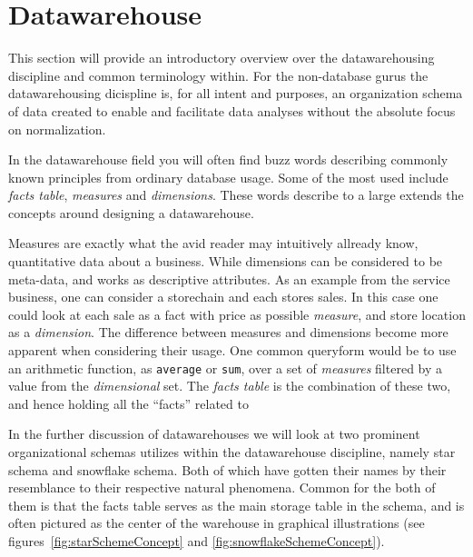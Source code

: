 \section{Datawarehouse}
	\noindent
	This section will provide an introductory overview over the datawarehousing discipline and common terminology within. 
	For the non-database gurus the datawarehousing dicispline is, for all intent and purposes, an organization schema of
	data created to enable and facilitate data analyses without the absolute focus on normalization\cite{oracle:dataware}.
	
	\bigskip\noindent
	In the datawarehouse field you will often find buzz words describing commonly known principles from ordinary database
	usage. Some of the most used include \textit{facts table}, \textit{measures} and \textit{dimensions}.
	These words describe to a large extends the concepts around designing a datawarehouse. 
	
	\bigskip\noindent
	Measures are exactly what the avid reader may intuitively allready know, quantitative data about a business.
	While dimensions can be considered to be meta-data, and works as descriptive attributes. 
	As an example from the service business, one can consider a storechain and each stores sales. 
	In this case one could look at each sale as a fact with price as possible \textit{measure},
	and store location as a \textit{dimension}. 
	The difference between measures and dimensions become more apparent when considering their usage.
	One common queryform would be to use an arithmetic function, as \texttt{average} or \texttt{sum}, over a set of
	\textit{measures} filtered by a value from the \textit{dimensional} set.
	The \textit{facts table} is the combination of these two, and hence holding all the "`facts"' related to 
	
	
	\bigskip\noindent
	In the further discussion of datawarehouses we will look at two prominent organizational schemas utilizes 
	within the datawarehouse discipline, namely star schema and snowflake schema. 
	Both of which have gotten their names by their resemblance to their respective natural phenomena.
	Common for the both of them is that the facts table serves as the main storage table in the schema, 
	and is often pictured as the center of the warehouse in graphical illustrations (see figures~\ref{fig:starSchemeConcept} and \ref{fig:snowflakeSchemeConcept}). 
	
